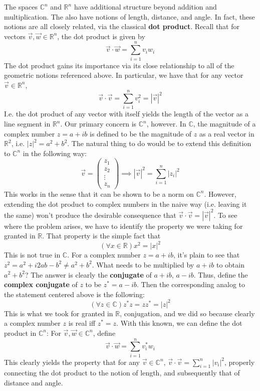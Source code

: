 \documentclass{article}
\theoremstyle{definition}
\theoremstyle{plain}
\theoremstyle{theorem}
\begin{document}
The spaces $\mathbb{C}^n$ and $\mathbb{R}^n$ have additional structure beyond addition and multiplication. The also have notions of length, distance, and angle. In fact, these notions are all closely related, via the classical \textbf{dot product}. Recall that for vectors $\vec{v},\vec{w} \in \mathbb{R}^n$, the dot product is given by 
	\[ \vec{v} \cdot \vec{w} = \sum_{i=1}^n v_iw_i \]
The dot product gains its importance via its close relationship to all of the geometric notions referenced above. In particular, we have that for any vector $\vec{v} \in \mathbb{R}^n$, 
\[ \vec{v} \cdot \vec{v} = \sum_{i=1}^n v_i^2 = |\vec{v}|^2 \]
I.e. the dot product of any vector with itself yields the length of the vector as a line segment in $\mathbb{R}^n$. Our primary concern is $\mathbb{C}^n$, however. In $\mathbb{C}$, the magnitude of a complex number $z=a+ib$ is defined to be the magnitude of $z$ as a real vector in $\mathbb{R}^2$, i.e. $|z|^2 = a^2+b^2$. The natural thing to do would be to extend this definition to $\mathbb{C}^n$ in the following way:
\[ \vec{v} = \begin{pmatrix} z_1 \\ z_2 \\ \vdots \\ z_n \end{pmatrix} \implies |\vec{v}|^2 = \sum_{i=1}^n |z_i|^2 \] 
This works in the sense that it can be shown to be a norm on $\mathbb{C}^n$. However, extending the dot product to complex numbers in the naive way (i.e. leaving it the same) won't produce the desirable consequence that $\vec{v} \cdot \vec{v} = |\vec{v}|^2$. To see where the problem arises, we have to identify the property we were taking for granted in $\mathbb{R}$. That property is the simple fact that
\[ (\forall x \in \mathbb{R})x^2 = |x|^2 \]
This is not true in $\mathbb{C}$. For a complex number $z = a+ib$, it's plain to see that $z^2 = a^2 + i2ab - b^2 \neq a^2+b^2$. What needs to be multiplied by $a+ib$ to obtain $a^2+b^2$? The answer is clearly the \textbf{conjugate} of $a+ib$, $a-ib$. Thus, define the \textbf{complex conjugate} of $z$ to be $z^* = a-ib$. Then the corresponding analog to the statement centered above is the following:
\[ (\forall z \in \mathbb{C})z^*z = zz^* = |z|^2 \]
This is what we took for granted in $\mathbb{R}$, conjugation, and we did so because clearly a complex number $z$ is real iff $z^* = z$. With this known, we can define the dot product in $\mathbb{C}^n$: For $\vec{v},\vec{w} \in \mathbb{C}^n$, define
\[ \vec{v} \cdot \vec{w} = \sum_{i=1}^n v_i^*w_i \]
This clearly yields the property that for any $\vec{v} \in \mathbb{C}^n$, $\vec{v} \cdot \vec{v} = \sum_{i=1}^n |v_i|^2$, properly connecting the dot product to the notion of length, and subsequently that of distance and angle. 
\end{document}

